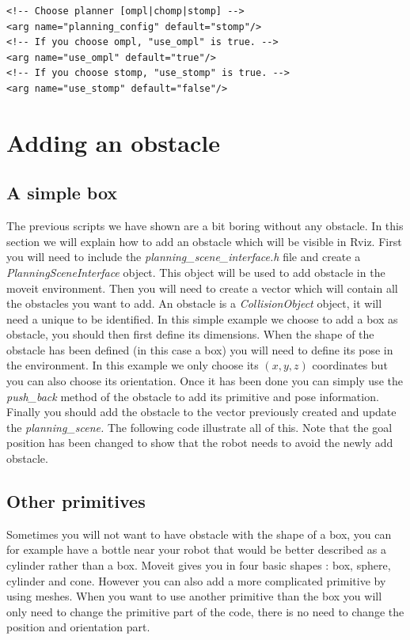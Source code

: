 \begin{lstlisting}
<!-- Choose planner [ompl|chomp|stomp] -->
<arg name="planning_config" default="stomp"/>
<!-- If you choose ompl, "use_ompl" is true. -->
<arg name="use_ompl" default="true"/>
<!-- If you choose stomp, "use_stomp" is true. -->
<arg name="use_stomp" default="false"/>
\end{lstlisting}


\section{Adding an obstacle}
\subsection{A simple box}

The previous scripts we have shown are a bit boring without any obstacle. In this section we will explain how to add an obstacle which will be visible in Rviz. First you will need to include the \emph{planning\_scene\_interface.h} file and create a \emph{PlanningSceneInterface} object. This object will be used to add obstacle in the moveit environment. Then you will need to create a vector which will contain all the obstacles you want to add. An obstacle is a \emph{CollisionObject} object, it will need a unique to be identified. In this simple example we choose to add a box as obstacle, you should then first define its dimensions. When the shape of the obstacle has been defined (in this case a box) you will need to define its pose in the environment. In this example we only choose its $(x,y,z)$ coordinates but you can also choose its orientation. Once it has been done you can simply use the \emph{push\_back} method of the obstacle to add its primitive and pose information. Finally you should add the obstacle to the vector previously created and update the \emph{planning\_scene.
}
The following code illustrate all of this. Note that the goal position has been changed to show that the robot needs to avoid the newly add obstacle.





\subsection{Other primitives}
Sometimes you will not want to have obstacle with the shape of a box, you can for example have a bottle near your robot that would be better described as a cylinder rather than a box. Moveit gives you in four basic shapes : box, sphere, cylinder and cone. However you can also add a more complicated primitive by using meshes. When you want to use another primitive than the box you will only need to change the primitive part of the code, there is no need to change the position and orientation part.

